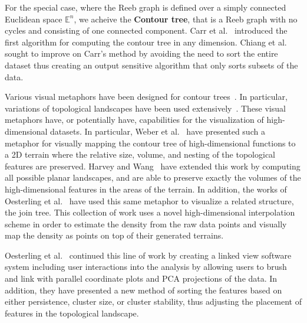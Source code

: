 
For the special case, where the Reeb graph is defined over a simply connected Euclidean space $\mathbb{E}^n$, we acheive the \textbf{Contour tree}, that is a Reeb graph with no cycles and consisting of one connected component.
%
Carr et al.~\cite{CarrSnoeyinkAxen2003} introduced the first algorithm for computing the contour tree in any dimension.
%
Chiang et al.~\cite{ChiangLenzLu2005} sought to improve on Carr's method by avoiding the need to sort the entire dataset thus creating an output sensitive algorithm that only sorts subsets of the data.
%

Various visual metaphors have been designed for contour trees~\cite{PascucciCole-McLaughlinScorzelli2009, WeberBremerPascucci2012}.
%
In particular, variations of topological landscapes have been used extensively~\cite{BeketayevMorozovWeber2012, DemirBeketayevWeber2012, HarveyWang2010, OesterlingHeineJanicke2010, OesterlingHeineJanicke2011, WeberBremerPascucci2007}.
%
These visual metaphors have, or potentially have, capabilities for the visualization of high-dimensional datasets.
%
In particular, Weber et al.~\cite{WeberBremerPascucci2007} have presented such a metaphor for visually mapping the contour tree of high-dimensional functions to a 2D terrain where the relative size, volume, and nesting of the topological features are preserved.
%
Harvey and Wang~\cite{HarveyWang2010} have extended this work by computing all possible planar landscapes, and are able to preserve exactly the volumes of the high-dimensional features in the areas of the terrain.
%
In addition, the works of Oesterling et al.~\cite{OesterlingHeineJanicke2010, OesterlingHeineJanicke2011} have used this same metaphor to visualize a related structure, the join tree.
%
This collection of work uses a novel high-dimensional interpolation scheme in order to estimate the density from the raw data points and visually map the density as points on top of their generated terrains.

Oesterling et al.~\cite{OesterlingHeineGunther2013} continued this line of work by creating a linked view software system including user interactions into the analysis by allowing users to brush and link with parallel coordinate plots and PCA projections of the data.
%
In addition, they have presented a new method of sorting the features based on either persistence, cluster size, or cluster stability, thus adjusting the placement of features in the topological landscape.

